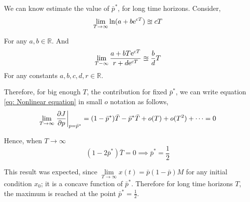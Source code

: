 We can know estimate the value of $\bar{p}^*$, for long time horizons. Consider,  
\begin{equation}	
\lim\limits_{T\rightarrow \infty} \ln(a+b\mathrm{e}^{cT})\approxeq cT
\end{equation}

For any $a,b \in \mathbb{R}$. And
\begin{equation}
	\lim\limits_{T-\infty}\frac{a+bT\mathrm{e}^{cT}}{r+d\mathrm{e}^{cT}} \approxeq \frac{b}{d}T
\end{equation}
For any constants $a,b,c,d,r \in \mathbb{R}$. 

Therefore, for big enough $T$, the contribution for fixed $\bar{p}^*$, we can write equation \ref{eq: Nonlinear equation} in small $o$ notation as follows,
\begin{equation}
\lim\limits_{T\rightarrow \infty}\left.\frac{\partial J}{{\partial p}}\right|_{p=\bar{p}^*} =(1-\bar{p}^*)\bar{T}-\bar{p}^*\bar{T}+o(T)+o(T^2)+\dots=0 
\end{equation}

Hence, when $T\rightarrow \infty$
\begin{equation}
	(1-2\bar{p}^*)\bar{T}=0\implies \bar{p}^*=\frac{1}{2}
\end{equation}

This result was expected, since 
$\lim\limits_{T\rightarrow\infty} x(t) = \bar{p}(1-\bar{p})M$ for any initial condition $x_0$; it is a concave function of $\bar{p}^*$. Therefore for long time horizons $T$, the maximum is reached at the point $\bar{p}^*=\frac{1}{2}$.
